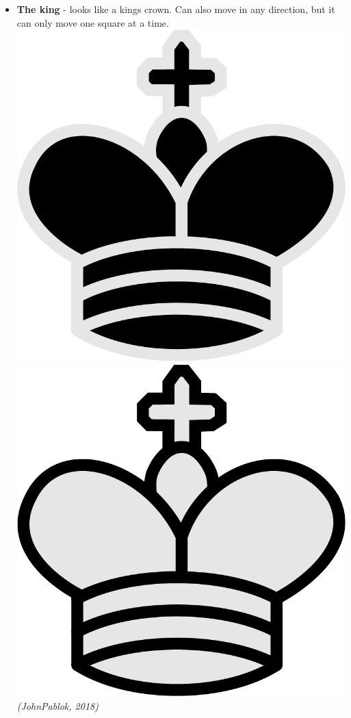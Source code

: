 \documentclass{article}
\begin{document}
\begin{itemize}
    \item \textbf{The king} - looks like a kings crown. Can also move in any direction, but it can only move one square at a time. \\
    \includegraphics[scale=0.1]{image9.png}
    \includegraphics[scale=0.1]{image8.png}
    \textit{(JohnPablok, 2018)}
    

\end{itemize}
\end{document}

